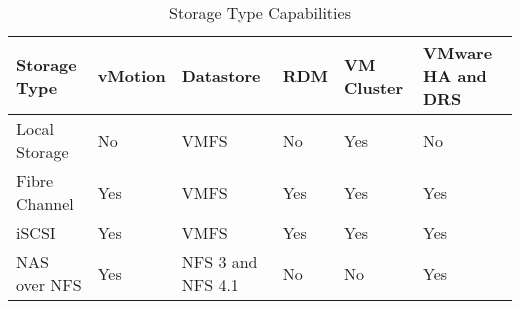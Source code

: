 \begin{table}[h!]
    \centering
    \caption{Storage Type Capabilities}
    \begin{tabular}{|l|l|l|l|l|l|}
    \hline
    \textbf{Storage Type} & \textbf{vMotion} & \textbf{Datastore} & \textbf{RDM} & \textbf{VM Cluster} & \textbf{VMware HA and DRS} \\ \hline
    Local Storage         & No               & VMFS                & No          & Yes                & No                          \\ \hline
    Fibre Channel         & Yes              & VMFS                & Yes         & Yes                & Yes                         \\ \hline
    iSCSI                 & Yes              & VMFS                & Yes         & Yes                & Yes                         \\ \hline
    NAS over NFS          & Yes              & NFS 3 and NFS 4.1   & No          & No                 & Yes                         \\ \hline
    \end{tabular}
\end{table}
